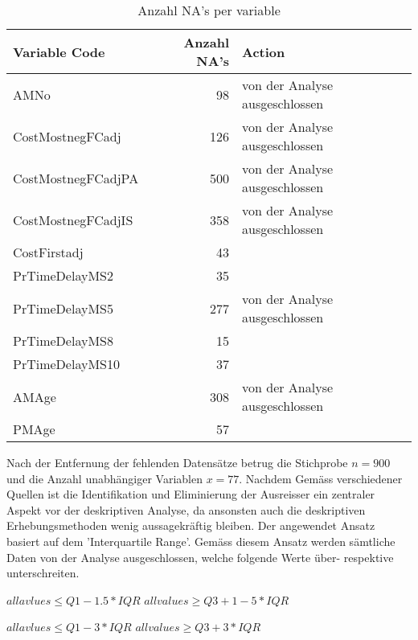 \newline
\begin{table}
	\centering
	\caption{Anzahl NA's per variable}
	\begin{tabular} {| l| r | l |}
			\textbf{Variable Code} & \textbf{Anzahl NA's} & \textbf{Action}\\\hline
			AMNo & 98 & von der Analyse ausgeschlossen\\
			CostMostnegFCadj & 126 & von der Analyse ausgeschlossen\\
			CostMostnegFCadjPA & 500 & von der Analyse ausgeschlossen\\
			CostMostnegFCadjIS & 358 & von der Analyse ausgeschlossen\\
			CostFirstadj & 43 &\\
			PrTimeDelayMS2 & 35 &\\
			PrTimeDelayMS5 & 277 & von der Analyse ausgeschlossen\\
			PrTimeDelayMS8 & 15 &\\
			PrTimeDelayMS10 & 37 &\\
			AMAge & 308  & von der Analyse ausgeschlossen\\
			PMAge & 57 & \\		
	\end{tabular}
\end{table}
Nach der Entfernung der fehlenden Datensätze betrug die Stichprobe $n = 900$ und die Anzahl unabhängiger Variablen $ x = 77$. Nachdem 
\newline
Gemäss verschiedener Quellen ist die Identifikation und Eliminierung der Ausreisser ein zentraler Aspekt vor der deskriptiven Analyse, da ansonsten auch die deskriptiven Erhebungsmethoden wenig aussagekräftig bleiben. Der angewendet Ansatz basiert auf dem 'Interquartile Range'. Gemäss diesem Ansatz werden sämtliche Daten von der Analyse ausgeschlossen, welche folgende Werte über- respektive unterschreiten.
\newline\newline
\begin{centering}
		$ all avlues \leq Q1 - 1.5 * IQR$
		\newline
		$ all values \geq Q3 + 1-5 * IQR$
\end{centering}
\newline
\newline
\begin{centering}
		$ all avlues \leq Q1 - 3 * IQR$
		\newline
		$ all values \geq Q3 + 3 * IQR$
\end{centering}
